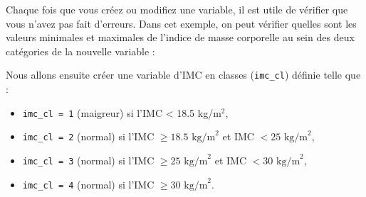 \documentclass[
]{book}
\newenvironment{Shaded}{\begin{snugshade}}{\end{snugshade}}
\newcommand{\CommentTok}[1]{\textcolor[rgb]{0.56,0.35,0.01}{\textit{#1}}}
\newcommand{\DecValTok}[1]{\textcolor[rgb]{0.00,0.00,0.81}{#1}}
\newcommand{\DocumentationTok}[1]{\textcolor[rgb]{0.56,0.35,0.01}{\textbf{\textit{#1}}}}
\newcommand{\FunctionTok}[1]{\textcolor[rgb]{0.13,0.29,0.53}{\textbf{#1}}}
\newcommand{\NormalTok}[1]{#1}
\newcommand{\OtherTok}[1]{\textcolor[rgb]{0.56,0.35,0.01}{#1}}
\newcommand{\SpecialCharTok}[1]{\textcolor[rgb]{0.81,0.36,0.00}{\textbf{#1}}}
\providecommand{\tightlist}{%
  \setlength{\itemsep}{0pt}\setlength{\parskip}{0pt}}
\begin{document}
\begin{Shaded}
\end{Shaded}

Chaque fois que vous créez ou modifiez une variable, il est utile de vérifier que vous n'avez pas fait d'erreurs. Dans cet exemple, on peut vérifier quelles sont les valeurs minimales et maximales de l'indice de masse corporelle au sein des deux catégories de la nouvelle variable :

\begin{Shaded}
\end{Shaded}

Nous allons ensuite créer une variable d'IMC en classes (\texttt{imc\_cl}) définie telle que :

\begin{itemize}
\tightlist
\item
  \texttt{imc\_cl\ =\ 1} (maigreur) si l'IMC \textless{} 18.5 kg/m\(^2\),
\item
  \texttt{imc\_cl\ =\ 2} (normal) si l'IMC \(\geq 18.5 \text{ kg/m}^2\) et IMC \(< 25 \text{ kg/m}^2\),
\item
  \texttt{imc\_cl\ =\ 3} (normal) si l'IMC \(\geq 25 \text{ kg/m}^2\) et IMC \(< 30 \text{ kg/m}^2\),
\item
  \texttt{imc\_cl\ =\ 4} (normal) si l'IMC \(\geq 30 \text{ kg/m}^2\).
\end{itemize}
\end{document}
